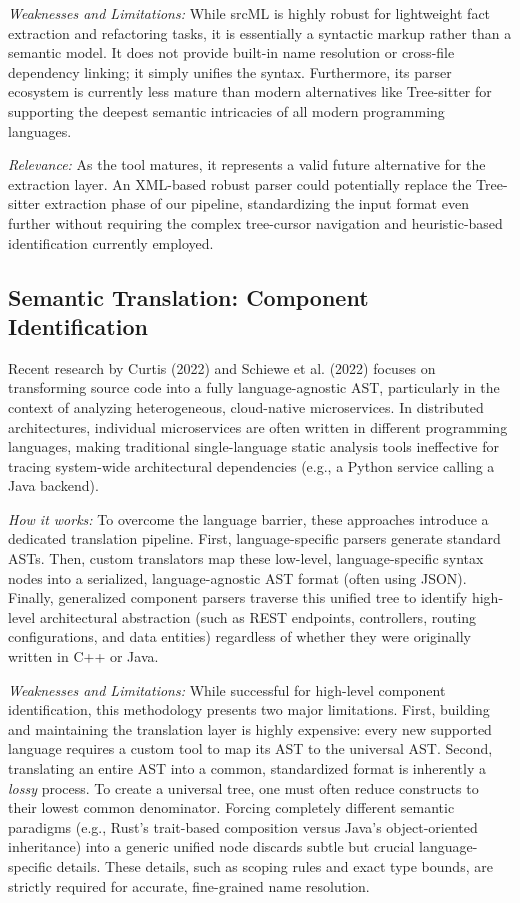 \textit{Weaknesses and Limitations:} While srcML is highly robust for
lightweight fact extraction and refactoring tasks, it is essentially
a syntactic markup rather than a semantic model. It does not provide
built-in name resolution or cross-file dependency linking; it simply
unifies the syntax. Furthermore, its parser ecosystem is currently
less mature than modern alternatives like Tree-sitter for supporting
the deepest semantic intricacies of all modern programming languages.

\textit{Relevance:} As the tool matures, it represents a valid future
alternative for the extraction layer. An XML-based robust parser
could potentially replace the Tree-sitter extraction phase of our
pipeline, standardizing the input format even further without
requiring the complex tree-cursor navigation and heuristic-based
identification currently employed.

\subsection{Semantic Translation: Component Identification}

Recent research by Curtis (2022) \cite{curtis_language-agnostic_2022}
and Schiewe et al.
(2022) \cite{schiewe_advancing_2022} focuses on transforming source code
into a fully language-agnostic AST, particularly in the context of
analyzing heterogeneous, cloud-native microservices. In distributed
architectures, individual microservices are often written in
different programming languages, making traditional single-language
static analysis tools ineffective for tracing system-wide
architectural dependencies (e.g., a Python service calling a Java backend).

\textit{How it works:} To overcome the language barrier, these
approaches introduce a dedicated translation pipeline. First,
language-specific parsers generate standard ASTs. Then, custom
translators map these low-level, language-specific syntax nodes into
a serialized, language-agnostic AST format (often using JSON).
Finally, generalized component parsers traverse this unified tree to
identify high-level architectural abstraction (such as REST
  endpoints, controllers, routing configurations, and data
entities) regardless of whether they were originally written in C++ or Java.

\textit{Weaknesses and Limitations:} While successful for high-level
component identification, this methodology presents two major
limitations. First, building and maintaining the translation layer is
highly expensive: every new supported language requires a custom tool
to map its AST to the universal AST. Second, translating an entire
AST into a common, standardized format is inherently a \textit{lossy}
process. To create a universal tree, one must often reduce constructs
to their lowest common denominator. Forcing completely different
semantic paradigms (e.g., Rust's trait-based composition versus
Java's object-oriented inheritance) into a generic unified node
discards subtle but crucial language-specific details. These details,
such as scoping rules and exact type bounds, are strictly required
for accurate, fine-grained name resolution.

